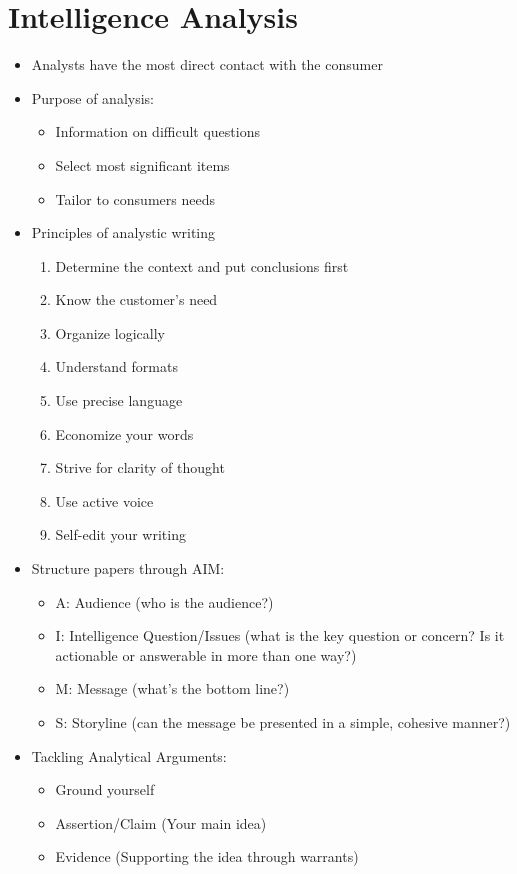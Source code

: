 \documentclass[11pt]{article}
\begin{document}
\section{Intelligence Analysis}
\label{sec:org57b123c}
\begin{itemize}
\item Analysts have the most direct contact with the consumer
\item Purpose of analysis:
\begin{itemize}
\item Information on difficult questions
\item Select most significant items
\item Tailor to consumers needs
\end{itemize}
\item Principles of analystic writing
\begin{enumerate}
\item Determine the context and put conclusions first
\item Know the customer's need
\item Organize logically
\item Understand formats
\item Use precise language
\item Economize your words
\item Strive for clarity of thought
\item Use active voice
\item Self-edit your writing
\end{enumerate}
\item Structure papers through AIM:
\begin{itemize}
\item A: Audience (who is the audience?)
\item I: Intelligence Question/Issues (what is the key question or concern? Is it actionable or answerable in more than one way?)
\item M: Message (what's the bottom line?)
\item S: Storyline (can the message be presented in a simple, cohesive manner?)
\end{itemize}
\item Tackling Analytical Arguments:
\begin{itemize}
\item Ground yourself
\item Assertion/Claim (Your main idea)
\item Evidence (Supporting the idea through warrants)

\end{itemize}
\end{itemize}
\end{document}
